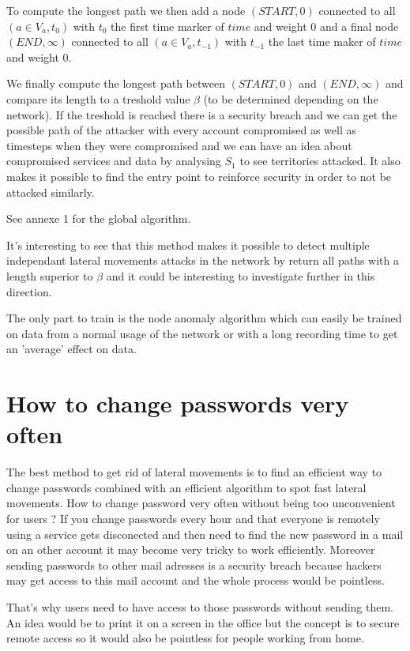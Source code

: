 \documentclass[11pt]{article}
\begin{document}
To compute the longest path we then add a node $(START,0)$ connected to all $(a\in V_a,t_0)$ with $t_0$ the first time marker of $time$ and weight 0 and a final node $(END,\infty)$ connected to all $(a\in V_a,t_{-1})$ with $t_{-1}$ the last time maker of $time$ and weight 0. 

We finally compute the longest path between $(START,0)$ and $(END,\infty)$ and compare its length to a treshold value $\beta$ (to be determined depending on the network). If the treshold is reached there is a security breach and we can get the possible path of the attacker with every account compromised as well as timesteps when they were compromised and we can have an idea about compromised services and data by analysing $S_1$ to see territories attacked. It also makes it possible to find the entry point to reinforce security in order to not be attacked similarly.

See annexe 1 for the global algorithm.

It's interesting to see that this method makes it possible to detect multiple independant lateral movements attacks in the network by return all paths with a length superior to $\beta$ and it could be interesting to investigate further in this direction.

The only part to train is the node anomaly algorithm which can easily be trained on data from a normal usage of the network or with a long recording time to get an 'average' effect on data.

\section{How to change passwords very often}
The best method to get rid of lateral movements is to find an efficient way to change passwords combined with an efficient algorithm to spot fast lateral movements. How to change password very often without being too unconvenient for users ? If you change passwords every hour and that everyone is remotely using a service gets disconected and then need to find the new password in a mail on an other account it may become very tricky to work efficiently. Moreover sending passwords to other mail adresses is a security breach because hackers may get access to this mail account and the whole process would be pointless.

That's why users need to have access to those passwords without sending them. An idea would be to print it on a screen in the office but the concept is to secure remote access so it would also be pointless for people working from home.
\end{document}
